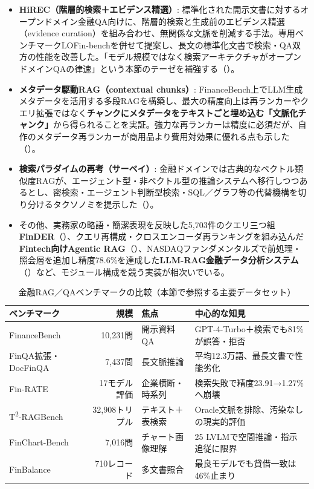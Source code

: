 \begin{itemize}
  \item \textbf{HiREC（階層的検索＋エビデンス精選）}: 標準化された開示文書に対するオープンドメイン金融QA向けに、階層的検索と生成前のエビデンス精選（evidence curation）を組み合わせ、無関係な文脈を削減する手法。専用ベンチマークLOFin-benchを併せて提案し、長文の標準化文書で検索・QA双方の性能を改善した。「モデル規模ではなく検索アーキテクチャがオープンドメインQAの律速」という本節のテーゼを補強する（\cite{x02hirec2025}）。
  \item \textbf{メタデータ駆動RAG（contextual chunks）}: FinanceBench上でLLM生成メタデータを活用する多段RAGを構築し、最大の精度向上は再ランカーやクエリ拡張ではなく\textbf{チャンクにメタデータをテキストごと埋め込む「文脈化チャンク」}から得られることを実証。強力な再ランカーは精度に必須だが、自作のメタデータ再ランカーが商用品より費用対効果に優れる点も示した（\cite{x02metadatarag2025}）。
  \item \textbf{検索パラダイムの再考（サーベイ）}: 金融ドメインでは古典的なベクトル類似度RAGが、エージェント型・非ベクトル型の推論システムへ移行しつつあるとし、密検索・エージェント判断型検索・SQL／グラフ等の代替機構を切り分けるタクソノミを提示した（\cite{x02rethinkretrieval2025}）。
  \item その他、実務家の略語・簡潔表現を反映した5,703件のクエリ三つ組\textbf{FinDER}（\cite{finder2025}）、クエリ再構成・クロスエンコーダ再ランキングを組み込んだ\textbf{Fintech向けAgentic RAG}（\cite{ragfintech2025}）、NASDAQファンダメンタルズで前処理・照会層を追加し精度78.6\%を達成した\textbf{LLM-RAG金融データ分析システム}（\cite{finllmrag2025}）など、モジュール構成を競う実装が相次いでいる。
\end{itemize}

\begin{table}[htbp]
\centering
\small
\caption{金融RAG／QAベンチマークの比較（本節で参照する主要データセット）}
\label{tab:finrag-benchmarks}
\begin{tabularx}{\textwidth}{@{}l r l X@{}}
\toprule
\textbf{ベンチマーク} & \textbf{規模} & \textbf{焦点} & \textbf{中心的な知見} \\
\midrule
FinanceBench \cite{financebench2023} & 10,231問 & 開示資料QA & GPT-4-Turbo＋検索でも81\%が誤答・拒否 \\
FinQA拡張・DocFinQA \cite{x02docfinqa2024} & 7,437問 & 長文脈推論 & 平均12.3万語、最長文書で性能劣化 \\
Fin-RATE \cite{finrate2026} & 17モデル評価 & 企業横断・時系列 & 検索失敗で精度23.91→1.27\%へ崩壊 \\
T\textsuperscript{2}-RAGBench \cite{x02t2ragbench2026} & 32,908トリプル & テキスト＋表検索 & Oracle文脈を排除、汚染なしの現実的評価 \\
FinChart-Bench \cite{x02finchartbench2025} & 7,016問 & チャート画像理解 & 25 LVLMで空間推論・指示追従に限界 \\
FinBalance \cite{x02finbalance2026} & 710レコード & 多文書照合 & 最良モデルでも貸借一致は46\%止まり \\
\bottomrule
\end{tabularx}
\end{table}


